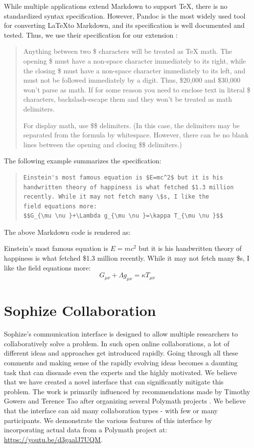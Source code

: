 \documentclass[]{ceurart}
\begin{document}
While multiple applications extend Markdown to support TeX, there is no standardized syntax specification. However, Pandoc is the most widely used tool for converting \LaTeX\space to Markdown, and its specification is well documented and tested. Thus, we use their specification for our extension \cite{pandoc}:

\blockquote{Anything between two \$ characters will be treated as TeX math. The opening \$ must have a non-space character immediately to its right, while the closing \$ must have a non-space character immediately to its left, and must not be followed immediately by a digit. Thus, \$20,000 and \$30,000 won’t parse as math. If for some reason you need to enclose text in literal \$ characters, backslash-escape them and they won’t be treated as math delimiters.

For display math, use \$\$ delimiters. (In this case, the delimiters may be separated from the formula by whitespace. However, there can be no blank lines between the opening and closing \$\$ delimiters.)}

The following example summarizes the specification:
\begin{quote}
\begin{verbatim} 
Einstein's most famous equation is $E=mc^2$ but it is his
handwritten theory of happiness is what fetched $1.3 million
recently. While it may not fetch many \$s, I like the
field equations more: 
$$G_{\mu \nu }+\Lambda g_{\mu \nu }=\kappa T_{\mu \nu }$$
\end{verbatim}
\end{quote}


The above Markdown code is rendered as:
\begin{mdframed}
Einstein's most famous equation is $E=mc^2$ but it is his handwritten theory of happiness is
what fetched \$1.3 million recently. While it may not fetch many \$s, I like the field
equations more: $$G_{\mu \nu }+\Lambda g_{\mu \nu }=\kappa T_{\mu \nu }$$
\end{mdframed}

\section{Sophize Collaboration}

Sophize's communication interface is designed to allow multiple researchers to collaboratively solve a problem. In such open online collaborations, a lot of different ideas and approaches get introduced rapidly. Going through all these comments and making sense of the rapidly evolving ideas becomes a daunting task that can dissuade even the experts and the highly motivated. We believe that we have created a novel interface that can significantly mitigate this problem. The work is primarily influenced by recommendations made by Timothy Gowers and Terence Tao after organizing several Polymath projects \cite{polymath_blog}. We believe that the interface can aid many collaboration types - with few or many participants. We demonstrate the various features of this interface by incorporating actual data from a Polymath project at: \url{https://youtu.be/d3gaalJ7UQM}.
\end{document}
